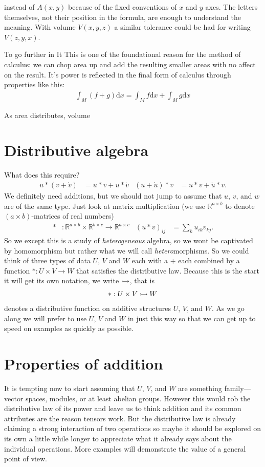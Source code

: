 instead of $A(x,y)$ 
because of the fixed conventions of $x$ and $y$ axes.  The letters themselves, not their position 
in the formula, are enough to understand the meaning.  With volume $V(x,y,z)$ a similar 
tolerance could be had for writing $V(z,y,x)$.  

To go further in
It 
This is one of the foundational reason for the method of calculus: we can chop area up and add the resulting smaller areas
with no affect on the result.  It's power is reflected in the final form of calculus through properties like this:
\begin{align*}
    \int_M (f+g)\text{d}x = \int_M f \text{d}x + \int_M g \text{d}x
\end{align*}


As area distributes, volume 

\section{Distributive algebra}


What does this require?
\begin{align}
    u*(v+\acute{v}) & = u*v+u*\acute{v}
    & 
    (u+\acute{u})*v & = u*v + \acute{u}*v.
\end{align}
We definitely need additions, but we should not jump to assume that $u$, $v$, and $w$ are 
of the same type.  Just look at  matrix 
multiplication (we use $\mathbb{R}^{a\times b}$ to denote $(a\times b)$-matrices 
of real numbers)
\begin{align*}
    *&:\mathbb{R}^{a\times b}\times \mathbb{R}^{b\times c}\to \mathbb{R}^{a\times c}
    &
    (u*v)_{ij} & = \sum_k u_{ik}v_{kj}.
\end{align*}
So we except this is a study of \emph{heterogeneous} algebra, so we wont be
captivated by homomorphism but rather what we will call \emph{hetero}morphisms.
So we could think of three types of data $U$, $V$ and $W$ each with a $+$ each
combined by a function 
$*:U\times V\to W$
that satisfies the distributive law.  Because this is the start it will get its own 
notation, we write $\rightarrowtail$, that is 
\begin{align*}
    *:U\times V\rightarrowtail W
\end{align*}
denotes a distributive function on additive structures $U$, $V$, and $W$.
As we go along we will prefer to use $U$, $V$ and $W$ in just this way so that 
we can get up to speed on examples as quickly as possible.


\section{Properties of addition}
It is tempting now to start  assuming that $U$, $V$, and $W$ are 
something family---vector spaces, modules, or at least abelian groups.
However this would rob the distributive law of its power and leave us to think 
addition and its common attributes are the reason tensors work.  But the 
distributive law is already claiming a strong interaction of two operations 
so maybe it should be explored on its own a little while longer to appreciate 
what it already says about the individual operations.  More examples will demonstrate 
the value of a general point of view.

